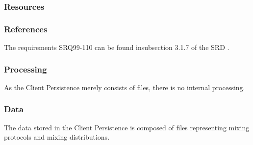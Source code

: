 \subsubsection*{Resources}

\subsubsection*{References}
The requirements SRQ99-110 can be found insubsection 3.1.7 of the SRD \cite{srd}.

\subsubsection*{Processing}
As the Client Persistence merely consists of files, there is no internal processing.

\subsubsection*{Data}
The data stored in the Client Persistence is composed of files representing mixing protocols and mixing distributions.